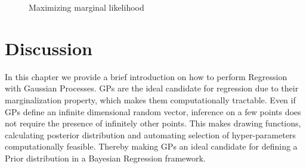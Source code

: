   \begin{figure}[!ht]
  \centering
    \quad
  \quad
       \caption{Maximizing marginal likelihood}\label{figGPRMarginalOptimized}
\end{figure}

\section{Discussion}
In this chapter we provide a brief introduction on how to perform Regression with Gaussian Processes. GPs are the ideal candidate for regression due to their marginalization property, which makes them computationally tractable. Even if GPs define an infinite dimensional random vector, inference on a few points does not require the presence of infinitely other points. This makes drawing functions, calculating posterior distribution and automating selection of hyper-parameters computationally feasible. Thereby making GPs an ideal candidate for defining a Prior distribution in a Bayesian Regression framework. 

